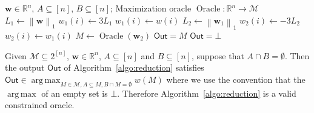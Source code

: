 \documentclass{article}
\newcommand{\M}{\mathcal M}
\newcommand{\del}{\backslash}
\newcommand{\RR}{\mathbb R}
\DeclareMathOperator*{\argmax}{arg\,max}
\DeclareMathOperator{\Oracle}{Oracle}
\DeclareMathOperator{\COracle}{COracle}
\newcommand{\out}{\mathsf{Out}}
\newcommand{\nor}[1]{\left\|#1\right\|}
\renewcommand{\vec}[1]{\boldsymbol{#1}}
\begin{document}


\begin{algorithm}[ht]
{
\small
\begin{algorithmic}[1]
\Require $\vec w\in \RR^n$, $A \subseteq [n]$, $B\subseteq [n]$; Maximization oracle $\Oracle: \RR^n \rightarrow \M$
\State $L_1\gets \nor{\vec w}_1$
    \State $w_1(i) \gets 3L_1$
  \Else
    \State $w_1(i) \gets w(i)$
  \EndIf
\EndFor
\State $L_2 \gets \nor{\vec w_1}_1$
    \State $w_2(i) \gets -3L_2$
  \Else
    \State $w_2(i) \gets w_1(i)$
  \EndIf
\EndFor
\State $M \gets \Oracle(\vec w_2)$
  \State $\out=M$
\Else
  \State $\out=\bot$
\EndIf
\State{\textbf{return: } $\out$}
\end{algorithmic}
\caption{$\COracle(\vec w, A,B)$}
\label{algo:reduction}
}
\end{algorithm}


\begin{lemma}
\label{fact:coracle}
Given $\M\subseteq 2^{[n]}$, $\vec w\in \RR^{n}$, $A \subseteq [n]$ and  $B\subseteq [n]$, suppose that $A\cap B=\emptyset$.
Then the output $\out$ of  Algorithm~\ref{algo:reduction} satisfies
$\out\in \argmax_{M\in \M, A\subseteq M, B\cap M=\emptyset}w(M)$
where we use the convention that the $\argmax$ of an empty set is $\bot$.
Therefore Algorithm~\ref{algo:reduction} is a valid constrained oracle.
\end{lemma}
\end{document}
